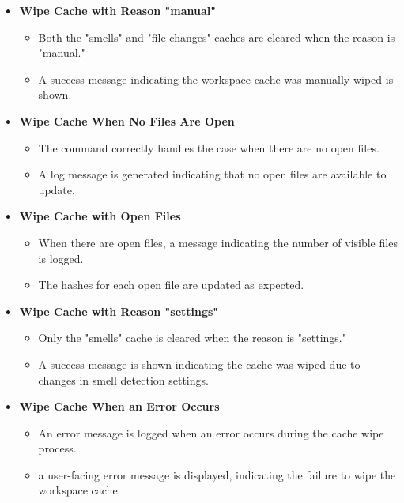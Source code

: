 \documentclass[12pt, titlepage]{article}
\begin{document}
\begin{enumerate}[label={\bf \textcolor{Maroon}{test-SRT-\arabic*}}, wide=0pt, font=\itshape]
\begin{itemize}
    \item \textbf{Wipe Cache with Reason "manual"}
    \begin{itemize}
        \item Both the "smells" and "file changes" caches are cleared when the reason is "manual."
        \item A success message indicating the workspace cache was manually wiped is shown.
    \end{itemize}

    \item \textbf{Wipe Cache When No Files Are Open}
    \begin{itemize}
        \item The command correctly handles the case when there are no open files.
        \item A log message is generated indicating that no open files are available to update.
    \end{itemize}

    \item \textbf{Wipe Cache with Open Files}
    \begin{itemize}
        \item When there are open files, a message indicating the number of visible files is logged.
        \item The hashes for each open file are updated as expected.
    \end{itemize}

    \item \textbf{Wipe Cache with Reason "settings"}
    \begin{itemize}
        \item Only the "smells" cache is cleared when the reason is "settings."
        \item A success message is shown indicating the cache was wiped due to changes in smell detection settings.
    \end{itemize}

    \item \textbf{Wipe Cache When an Error Occurs}
    \begin{itemize}
        \item An error message is logged when an error occurs during the cache wipe process.
        \item a user-facing error message is displayed, indicating the failure to wipe the workspace cache.
    \end{itemize}
\end{itemize}


\end{enumerate}
\end{document}

